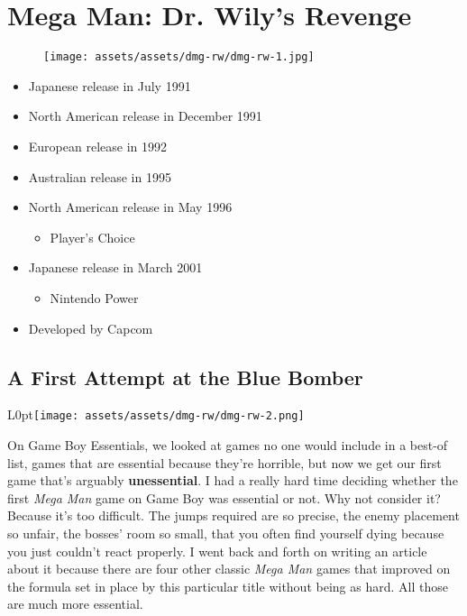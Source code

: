 \documentclass{book}
\begin{document}
\chapter*{Mega Man: Dr. Wily’s Revenge}
\vspace{\baselineskip}\begin{figure}[H]{\texttt{[image: assets/assets/dmg-rw/dmg-rw-1.jpg]}}\end{figure}\vspace{\baselineskip}
\begin{itemize}[left=0pt, nosep]
\item Japanese release in July 1991
\item North American release in December 1991
\item European release in 1992
\item Australian release in 1995
\item North American release in May 1996
\begin{itemize}
\item Player’s Choice
\end{itemize}
\item Japanese release in March 2001
\begin{itemize}
\item Nintendo Power
\end{itemize}
\item Developed by Capcom

\end{itemize}
\newpage\FloatBarrier\section*{A First Attempt at the Blue Bomber}
\begin{wrapfigure}{L}{0pt}{\texttt{[image: assets/assets/dmg-rw/dmg-rw-2.png]}}\end{wrapfigure}\noindent
On Game Boy Essentials, we looked at games no one would include in a best-of list, games that are essential because they’re horrible, but now we get our first game that’s arguably \textbf{unessential}. I had a really hard time deciding whether the first \emph{Mega Man} game on Game Boy was essential or not. Why not consider it? Because it’s too difficult. The jumps required are so precise, the enemy placement so unfair, the bosses’ room so small, that you often find yourself dying because you just couldn’t react properly. I went back and forth on writing an article about it because there are four other classic \emph{Mega Man} games that improved on the formula set in place by this particular title without being as hard. All those are much more essential.\par
\end{document}
